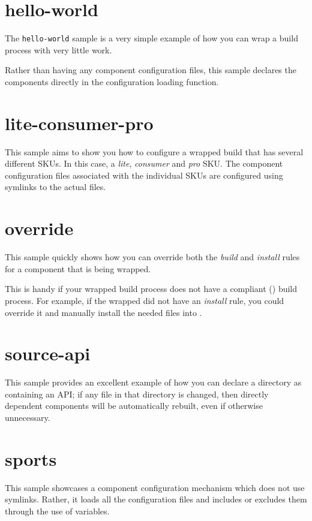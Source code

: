 \section{hello-world}

The \texttt{hello-world} sample is a very simple example of how you
can wrap a build process with very little work.

Rather than having any component configuration files, this sample
declares the components directly in the configuration loading
function.

\section{lite-consumer-pro}

This sample aims to show you how to configure a wrapped build that has
several different SKUs.  In this case, a \emph{lite}, \emph{consumer}
and \emph{pro} SKU.  The component configuration files associated with
the individual SKUs are configured using symlinks to the actual files.

\section{override}

This sample quickly shows how you can override both the \emph{build}
and \emph{install} rules for a component that is being wrapped.

This is handy if your wrapped build process does not have a compliant
() build process.  For example, if the
wrapped \makefile did not have an \emph{install} rule, you could
override it and manually install the needed files into \destdir.

\section{source-api}

This sample provides an excellent example of how you can declare a
directory as containing an API; if any file in that directory is
changed, then directly dependent components will be automatically
rebuilt, even if otherwise unnecessary.

\section{sports}

This sample showcases a component configuration mechanism which does
not use symlinks.  Rather, it loads all the configuration files and
includes or excludes them through the use of \make variables.

